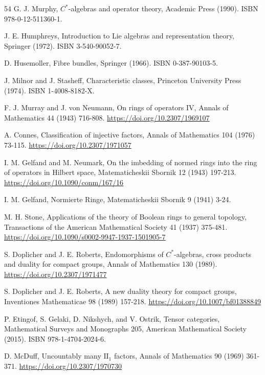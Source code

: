 \documentclass[11pt,letterpaper]{article}
\theoremstyle{definition}
\theoremstyle{remark}
\begin{document}
\begin{thebibliography}{54}
 G. J. Murphy, $C^*$-algebras and operator theory, Academic Press (1990). ISBN 978-0-12-511360-1.

 J. E. Humphreys, Introduction to Lie algebras and representation theory, Springer (1972). ISBN 3-540-90052-7.

 D. Husemoller, Fibre bundles, Springer (1966). ISBN 0-387-90103-5.

 J. Milnor and J. Stasheff, Characteristic classes, Princeton University Press (1974). ISBN 1-4008-8182-X.

 F. J. Murray and J. von Neumann, On rings of operators IV, Annals of Mathematics 44 (1943) 716-808. \url{https://doi.org/10.2307/1969107}

 A. Connes, Classification of injective factors, Annals of Mathematics 104 (1976) 73-115. \url{https://doi.org/10.2307/1971057}

 I. M. Gelfand and M. Neumark, On the imbedding of normed rings into the ring of operators in Hilbert space, Matematicheskii Sbornik 12 (1943) 197-213. \url{https://doi.org/10.1090/conm/167/16}

 I. M. Gelfand, Normierte Ringe, Matematicheskii Sbornik 9 (1941) 3-24.

 M. H. Stone, Applications of the theory of Boolean rings to general topology, Transactions of the American Mathematical Society 41 (1937) 375-481. \url{https://doi.org/10.1090/s0002-9947-1937-1501905-7}

 S. Doplicher and J. E. Roberts, Endomorphisms of $C^*$-algebras, cross products and duality for compact groups, Annals of Mathematics 130 (1989). \url{https://doi.org/10.2307/1971477}

 S. Doplicher and J. E. Roberts, A new duality theory for compact groups, Inventiones Mathematicae 98 (1989) 157-218. \url{https://doi.org/10.1007/bf01388849}

 P. Etingof, S. Gelaki, D. Nikshych, and V. Ostrik, Tensor categories, Mathematical Surveys and Monographs 205, American Mathematical Society (2015). ISBN 978-1-4704-2024-6.

 D. McDuff, Uncountably many $\mathrm{II}_1$ factors, Annals of Mathematics 90 (1969) 361-371. \url{https://doi.org/10.2307/1970730}


\end{thebibliography}
\end{document}
